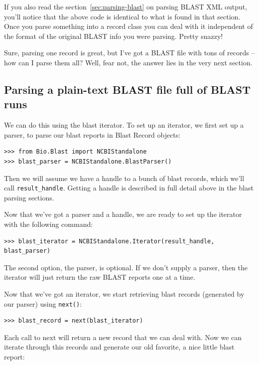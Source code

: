 \documentclass{report}
\begin{document}
If you also read the section~\ref{sec:parsing-blast} on parsing BLAST XML output, you'll notice that the above code is identical to what is found in that section. Once you parse something into a record class you can deal with it independent of the format of the original BLAST info you were parsing. Pretty snazzy!

Sure, parsing one record is great, but I've got a BLAST file with tons of records -- how can I parse them all? Well, fear not, the answer lies in the very next section.

\subsection{Parsing a plain-text BLAST file full of BLAST runs}

We can do this using the blast iterator. To set up an iterator, we first set up a parser, to parse our blast reports in Blast Record objects:

\begin{verbatim}
>>> from Bio.Blast import NCBIStandalone
>>> blast_parser = NCBIStandalone.BlastParser()
\end{verbatim}

Then we will assume we have a handle to a bunch of blast records, which we'll call \verb|result_handle|. Getting a handle is described in full detail above in the blast parsing sections.

Now that we've got a parser and a handle, we are ready to set up the iterator with the following command:

\begin{verbatim}
>>> blast_iterator = NCBIStandalone.Iterator(result_handle, blast_parser)
\end{verbatim}

The second option, the parser, is optional. If we don't supply a parser, then the iterator will just return the raw BLAST reports one at a time.

Now that we've got an iterator, we start retrieving blast records (generated by our parser) using \verb|next()|:

\begin{verbatim}
>>> blast_record = next(blast_iterator)
\end{verbatim}

Each call to next will return a new record that we can deal with. Now we can iterate through this records and generate our old favorite, a nice little blast report:
\end{document}
